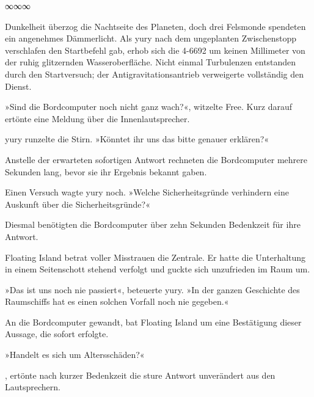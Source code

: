 \begin{center}
∞∞∞
\end{center}

Dunkelheit überzog die Nachtseite des Planeten, doch drei Felsmonde spendeten ein angenehmes Dämmerlicht. Als yury nach dem ungeplanten Zwischenstopp verschlafen den Startbefehl gab, erhob sich die 4-6692 um keinen Millimeter von der ruhig glitzernden Wasseroberfläche. Nicht einmal Turbulenzen entstanden durch den Startversuch; der Antigravitationsantrieb verweigerte vollständig den Dienst.

»Sind die Bordcomputer noch nicht ganz wach?«, witzelte Free. Kurz darauf ertönte eine Meldung über die Innenlautsprecher.


yury runzelte die Stirn. »Könntet ihr uns das bitte genauer erklären?«

Anstelle der erwarteten sofortigen Antwort rechneten die Bordcomputer mehrere Sekunden lang, bevor sie ihr Ergebnis bekannt gaben. 

Einen Versuch wagte yury noch. »Welche Sicherheitsgründe verhindern eine Auskunft über die Sicherheitsgründe?«

Diesmal benötigten die Bordcomputer über zehn Sekunden Bedenkzeit für ihre Antwort. 

Floating Island betrat voller Misstrauen die Zentrale. Er hatte die Unterhaltung in einem Seitenschott stehend verfolgt und guckte sich unzufrieden im Raum um.

»Das ist uns noch nie passiert«, beteuerte yury. »In der ganzen Geschichte des Raumschiffs hat es einen solchen Vorfall noch nie gegeben.«

An die Bordcomputer gewandt, bat Floating Island um eine Bestätigung dieser Aussage, die sofort erfolgte. 

»Handelt es sich um Altersschäden?«

, ertönte nach kurzer Bedenkzeit die sture Antwort unverändert aus den Lautsprechern.

